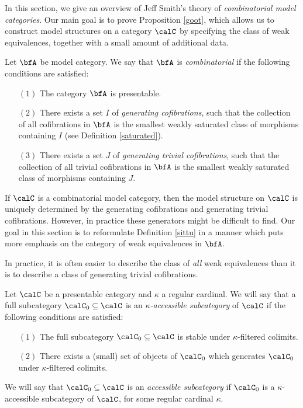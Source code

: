 \begin{Model Categories}
In this section, we give an overview of Jeff Smith's theory of {\it combinatorial model categories}. Our main goal is to prove Proposition \ref{goot}, which allows us to construct model structures on a  
category $\calC$ by specifying the class of weak equivalences, together with a small amount of additional data.

\begin{definition}[Smith]\label{sittu}
Let $\bfA$ be model category. We say that $\bfA$ is {\it combinatorial} if the following conditions are satisfied:
\begin{itemize}
\item[$(1)$] The category $\bfA$ is presentable.
\item[$(2)$] There exists a set $I$ of {\it generating cofibrations}, such that the collection of all cofibrations in $\bfA$ is the smallest weakly saturated class of morphisms containing $I$ (see Definition \ref{saturated}). 
\item[$(3)$] There exists a set $J$ of {\it generating trivial cofibrations}, such that the collection of all trivial cofibrations in $\bfA$ is the smallest weakly saturated class of morphisms containing $J$.
\end{itemize}
\end{definition}

If $\calC$ is a combinatorial model category, then the model structure on $\calC$ is uniquely determined by the generating cofibrations and generating trivial cofibrations. However, in practice these generators might be difficult to find. Our goal in this section is to reformulate Definition \ref{sittu} in a manner which puts more emphasis on the category of weak equivalences in $\bfA$. 

In practice, it is often easier to describe the class of {\em all} weak equivalences than it is to describe a class of generating trivial cofibrations. 

\begin{definition}\label{kappar}
Let $\calC$ be a presentable category and $\kappa$ a regular cardinal. We will say that a full subcategory $\calC_0 \subseteq \calC$ is an {\it $\kappa$-accessible subcategory} of
$\calC$ if the following conditions are satisfied:
\begin{itemize}
\item[$(1)$] The full subcategory $\calC_0 \subseteq \calC$ is stable under $\kappa$-filtered colimits.
\item[$(2)$] There exists a (small) set of objects of $\calC_0$ which generates $\calC_0$ under $\kappa$-filtered colimits. 
\end{itemize}
We will say that $\calC_0 \subseteq \calC$ is an {\it accessible subcategory} if $\calC_0$ is a $\kappa$-accessible subcategory of $\calC$, for some regular cardinal $\kappa$.
\end{definition}


\end{Model Categories}
